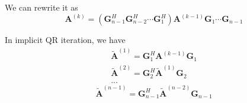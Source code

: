 \documentclass[english,onecolumn]{IEEEtran}
\begin{document}
\begin{enumerate}
    We can rewrite it as
    $$
    \mathbf{A}^{(k)}=\left(\mathbf{G}_{n-1}^{H} \mathbf{G}_{n-2}^{H} \cdots \mathbf{G}_{1}^{H}\right) \mathbf{A}^{(k-1)} \mathbf{G}_{1} \cdots \mathbf{G}_{n-1}
    $$
    
    In implicit QR iteration, we have
    $$
    \begin{array}{l}
    	\widetilde{\mathbf{A}}^{(1)}=\mathbf{G}_{1}^{H} \mathbf{A}^{(k-1)} \mathbf{G}_{1} \\
    	\widetilde{\mathbf{A}}^{(2)}=\mathbf{G}_{2}^{H} \widetilde{\mathbf{A}}^{(1)} \mathbf{G}_{2}\\
    	...
    \end{array}
    $$
    $$
    \widetilde{\mathbf{A}}^{(n-1)}=\mathbf{G}_{n-1}^{H} \widetilde{\mathbf{A}}^{(n-2)} \mathbf{G}_{n-1}
    $$
\end{enumerate}
\end{document}
